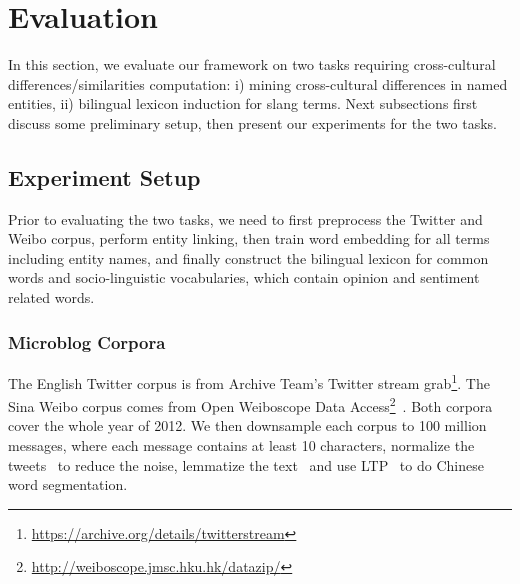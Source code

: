 \section{Evaluation}
\label{sec:eval}
In this section, we evaluate our framework on two tasks requiring cross-cultural differences/similarities computation: i) mining cross-cultural differences in named
entities, ii) bilingual lexicon induction for slang terms. Next subsections first discuss some
preliminary setup, then present our experiments for the two tasks.

\subsection{Experiment Setup}
\label{sec:prelim}
Prior to evaluating the two tasks, we need to first preprocess the Twitter and 
Weibo corpus, perform entity linking, then train word embedding for all terms including
entity names, and finally construct the bilingual lexicon for common words and
socio-linguistic vocabularies, which contain opinion and sentiment related words. 

\subsubsection{Microblog Corpora}
The English Twitter corpus is from Archive Team's Twitter stream 
grab\footnote{{\url{https://archive.org/details/twitterstream}}}.
The Sina Weibo corpus comes from Open Weiboscope 
Data Access\footnote{{\url{http://weiboscope.jmsc.hku.hk/datazip/}}}~\cite{fu2013assessing}.
Both corpora cover the whole year of 2012. 
We then downsample each corpus to 100 million messages, where each message contains at least 10 characters, normalize the tweets~\cite{han2012automatically} to reduce the noise, lemmatize the text~\cite{manning2014stanford} and use LTP~\cite{che2010ltp} to do Chinese word segmentation.

